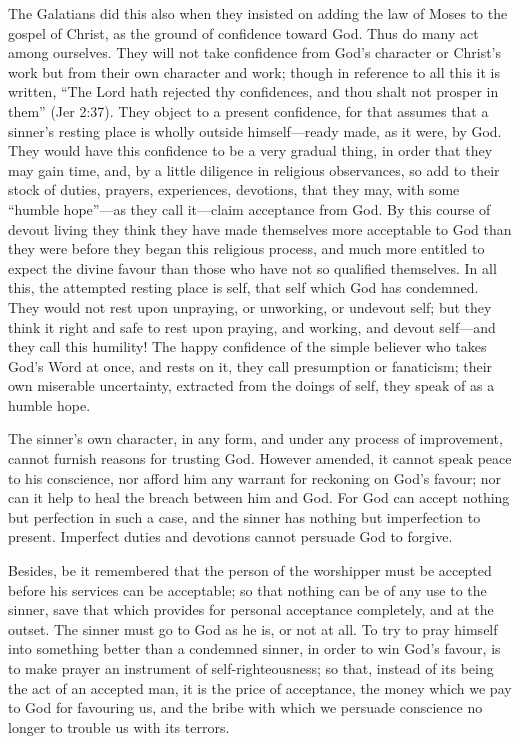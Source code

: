 \documentclass[
]{book}
\begin{document}
The Galatians did this also when they insisted on adding the law of Moses to the gospel of Christ, as the ground of confidence toward God. Thus do many act among ourselves. They will not take confidence from God's character or Christ's work but from their own character and work; though in reference to all this it is written, ``The Lord hath rejected thy confidences, and thou shalt not prosper in them'' (Jer 2:37). They object to a present confidence, for that assumes that a sinner's resting place is wholly outside himself---ready made, as it were, by God. They would have this confidence to be a very gradual thing, in order that they may gain time, and, by a little diligence in religious observances, so add to their stock of duties, prayers, experiences, devotions, that they may, with some ``humble hope''---as they call it---claim acceptance from God. By this course of devout living they think they have made themselves more acceptable to God than they were before they began this religious process, and much more entitled to expect the divine favour than those who have not so qualified themselves. In all this, the attempted resting place is self, that self which God has condemned. They would not rest upon unpraying, or unworking, or undevout self; but they think it right and safe to rest upon praying, and working, and devout self---and they call this humility! The happy confidence of the simple believer who takes God's Word at once, and rests on it, they call presumption or fanaticism; their own miserable uncertainty, extracted from the doings of self, they speak of as a humble hope.

The sinner's own character, in any form, and under any process of improvement, cannot furnish reasons for trusting God. However amended, it cannot speak peace to his conscience, nor afford him any warrant for reckoning on God's favour; nor can it help to heal the breach between him and God. For God can accept nothing but perfection in such a case, and the sinner has nothing but imperfection to present. Imperfect duties and devotions cannot persuade God to forgive.

Besides, be it remembered that the person of the worshipper must be accepted before his services can be acceptable; so that nothing can be of any use to the sinner, save that which provides for personal acceptance completely, and at the outset. The sinner must go to God as he is, or not at all. To try to pray himself into something better than a condemned sinner, in order to win God's favour, is to make prayer an instrument of self-righteousness; so that, instead of its being the act of an accepted man, it is the price of acceptance, the money which we pay to God for favouring us, and the bribe with which we persuade conscience no longer to trouble us with its terrors.
\end{document}
